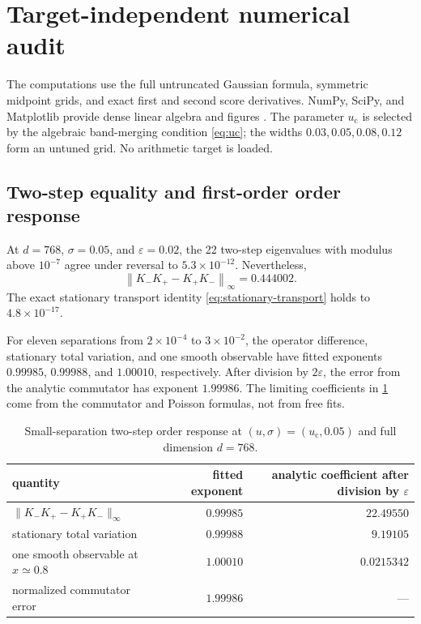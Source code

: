 \documentclass[11pt]{article}
\theoremstyle{definition}
\theoremstyle{remark}
\newcommand{\uc}{u_{\mathrm c}}
\newcommand{\norm}[1]{\left\lVert #1\right\rVert}
\begin{document}
\section{Target-independent numerical audit}
\label{sec:numerics}

The computations use the full untruncated Gaussian formula, symmetric
midpoint grids, and exact first and second score derivatives.  NumPy, SciPy,
and Matplotlib provide dense linear algebra and figures
\citep{HarrisEtAl2020,VirtanenEtAl2020,Hunter2007}.  The parameter $\uc$ is
selected by the algebraic band-merging condition \eqref{eq:uc}; the widths
$0.03,0.05,0.08,0.12$ form an untuned grid.  No arithmetic target is loaded.

\subsection{Two-step equality and first-order order response}

At $d=768$, $\sigma=0.05$, and $\varepsilon=0.02$, the 22 two-step
eigenvalues with modulus above $10^{-7}$ agree under reversal to
$5.3\times10^{-12}$.  Nevertheless,
\[
 \norm{K_-K_+-K_+K_-}_\infty=0.444002.
\]
The exact stationary transport identity \eqref{eq:stationary-transport} holds
to $4.8\times10^{-17}$.

For eleven separations from $2\times10^{-4}$ to $3\times10^{-2}$, the
operator difference, stationary total variation, and one smooth observable
have fitted exponents $0.99985$, $0.99988$, and $1.00010$, respectively.
After division by $2\varepsilon$, the error from the analytic commutator has
exponent $1.99986$.  The limiting coefficients in \cref{tab:pair-response}
come from the commutator and Poisson formulas, not from free fits.

\begin{table}[t]
\centering
\caption{Small-separation two-step order response at
$(u,\sigma)=(\uc,0.05)$ and full dimension $d=768$.}
\label{tab:pair-response}
\begin{tabular}{@{}lrr@{}}
\toprule
quantity & fitted exponent & analytic coefficient after division by $\varepsilon$\\
\midrule
$\|K_-K_+-K_+K_-\|_\infty$ & $0.99985$ & $22.49550$\\
stationary total variation & $0.99988$ & $9.19105$\\
one smooth observable at $x\simeq0.8$ & $1.00010$ & $0.0215342$\\
normalized commutator error & $1.99986$ & ---\\
\bottomrule
\end{tabular}
\end{table}
\end{document}
